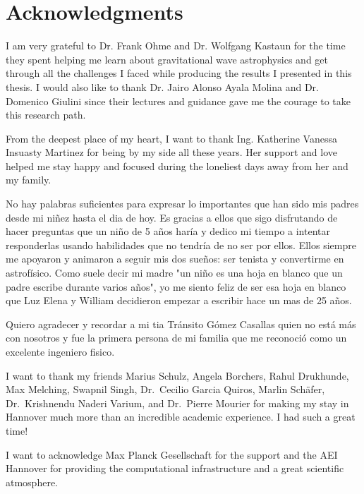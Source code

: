 \chapter*{Acknowledgments}

I am very grateful to Dr. Frank Ohme and Dr. Wolfgang Kastaun for the time they spent helping me learn about gravitational wave astrophysics and get through all the challenges I faced while producing the results I presented in this thesis. I would also like to thank Dr. Jairo Alonso Ayala Molina and Dr. Domenico Giulini since their lectures and guidance gave me the courage to take this research path.

From the deepest place of my heart, I want to thank Ing. Katherine Vanessa Insuasty Martinez for being by my side all these years. Her support and love helped me stay happy and focused during the loneliest days away from her and my family.

No hay palabras suficientes para expresar lo importantes que han sido mis padres desde mi niñez hasta el dia de hoy. Es gracias a ellos que sigo disfrutando de hacer preguntas que un niño de 5 años haría y dedico mi tiempo a intentar responderlas usando habilidades que no tendría de no ser por ellos. Ellos siempre me apoyaron y animaron a seguir mis dos sueños: ser tenista y convertirme en astrofísico. Como suele decir mi madre "un niño es una hoja en blanco que un padre escribe durante varios años", yo me siento feliz de ser esa hoja en blanco que Luz Elena y William decidieron empezar a escribir hace un  mas de 25 años.

Quiero agradecer y recordar a mi tia Tránsito Gómez Casallas quien no está más con nosotros y fue la primera persona de mi familia que me reconoció como un excelente ingeniero fisico.

I want to thank my friends Marius Schulz, Angela Borchers, Rahul Drukhunde, Max Melching, Swapnil Singh, Dr.~Cecilio Garcia Quiros, Marlin Schäfer, Dr.~Krishnendu Naderi Varium, and Dr.~Pierre Mourier for making my stay in Hannover much more than an incredible academic experience. I had such a great time!

I want to acknowledge Max Planck Gesellschaft for the support and the AEI Hannover for providing the computational infrastructure and a great scientific atmosphere.
